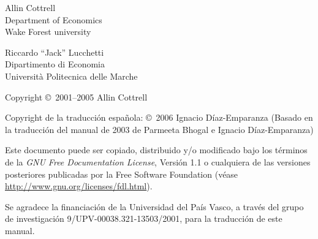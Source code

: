 \documentclass[oneside,spanish]{book}
\begin{document}
\VerbatimFootnotes

\setlength{\parindent}{0pt}
\setlength{\parskip}{1ex}


\thispagestyle{empty}

\begin{center}



{\large \sffamily 
Allin Cottrell\\
Department of Economics\\
Wake Forest university
}

\vspace{20pt}
{\large \sffamily 
Riccardo ``Jack'' Lucchetti\\
Dipartimento di Economia\\
Università Politecnica delle Marche
}



\end{center}
\clearpage


\thispagestyle{empty}


\vspace*{2in}

Copyright \copyright\ 2001--2005 Allin Cottrell

Copyright de la traducción española: \copyright\ 2006 Ignacio
Díaz-Emparanza (Basado en la traducción del manual de 2003 de Parmeeta
Bhogal e Ignacio Díaz-Emparanza)

Este documento puede ser copiado, distribuido y/o modificado bajo los
términos de la \textit{GNU Free Documentation License}, Versión 1.1 o
cualquiera de las versiones posteriores publicadas por la Free
Software Foundation (véase
\url{http://www.gnu.org/licenses/fdl.html}).  

Se agradece la financiación de la Universidad del País Vasco, a través
del grupo de investigación 9/UPV-00038.321-13503/2001, para la
traducción de este manual.

\clearpage


\pagestyle{headings}

\tableofcontents

\clearpage








\clearpage

\end{document}
